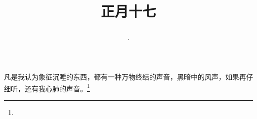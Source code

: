 \title{\date[d=26,m=2,y=2024][year:cn-y,年,month:cn,day:cn,日,·,weekday]·正月十七 }
凡是我认为象征沉睡的东西，都有一种万物终结的声音，黑暗中的风声，如果再仔细听，还有我心肺的声音。\footnote{ }

